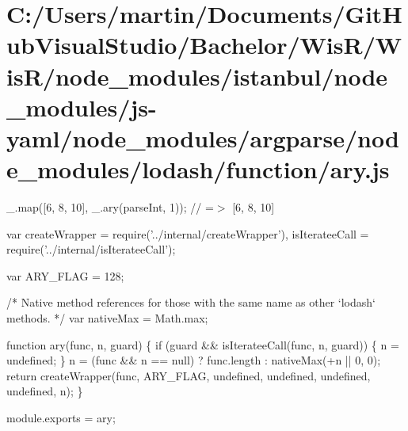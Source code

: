 \hypertarget{_c_1_2_users_2martin_2_documents_2_git_hub_visual_studio_2_bachelor_2_wis_r_2_wis_r_2node_module66fe72e857b9641b1528efb1aa1726d3}{}\section{C\+:/\+Users/martin/\+Documents/\+Git\+Hub\+Visual\+Studio/\+Bachelor/\+Wis\+R/\+Wis\+R/node\+\_\+modules/istanbul/node\+\_\+modules/js-\/yaml/node\+\_\+modules/argparse/node\+\_\+modules/lodash/function/ary.\+js}
\+\_\+.\+map(\mbox{[}\textquotesingle{}6\textquotesingle{}, \textquotesingle{}8\textquotesingle{}, \textquotesingle{}10\textquotesingle{}\mbox{]}, \+\_\+.\+ary(parse\+Int, 1)); // =$>$ \mbox{[}6, 8, 10\mbox{]}


\begin{DoxyCodeInclude}
var createWrapper = require(\textcolor{stringliteral}{'../internal/createWrapper'}),
    isIterateeCall = require(\textcolor{stringliteral}{'../internal/isIterateeCall'});

var ARY\_FLAG = 128;

\textcolor{comment}{/* Native method references for those with the same name as other `lodash` methods. */}
var nativeMax = Math.max;

\textcolor{keyword}{function} ary(func, n, guard) \{
  \textcolor{keywordflow}{if} (guard && isIterateeCall(func, n, guard)) \{
    n = undefined;
  \}
  n = (func && n == null) ? func.length : nativeMax(+n || 0, 0);
  \textcolor{keywordflow}{return} createWrapper(func, ARY\_FLAG, undefined, undefined, undefined, undefined, n);
\}

module.exports = ary;
\end{DoxyCodeInclude}
 